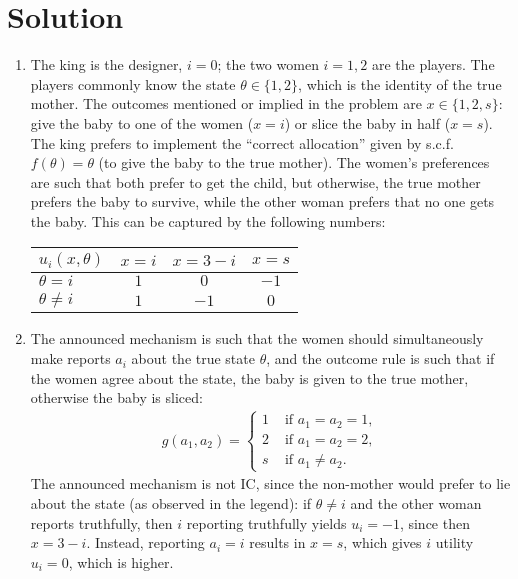 \documentclass[a4paper]{article}
\begin{document}
\section*{Solution}
\begin{enumerate}
	\item The king is the designer, $i=0$; the two women $i=1,2$ are the players. The players commonly know the state $\theta \in \{1,2\}$, which is the identity of the true mother. The outcomes mentioned or implied in the problem are $x \in \{1,2,s\}$: give the baby to one of the women ($x=i$) or slice the baby in half ($x=s$). The king prefers to implement the ``correct allocation'' given by s.c.f. $f(\theta) = \theta$ (to give the baby to the true mother). The women's preferences are such that both prefer to get the child, but otherwise, the true mother prefers the baby to survive, while the other woman prefers that no one gets the baby. This can be captured by the following numbers:
	\begin{center}
		\begin{tabular}{l | c | c | c |}
			$u_i(x,\theta)$ & $x=i$ & $x=3-i$	& $x=s$	\\ \hline
			$\theta=i$		& $1$ 	& $0$ 		& $-1$	\\ \hline
			$\theta \neq i$	& $1$	& $-1$		& $0$	\\ \hline
		\end{tabular}
	\end{center}
	
	\item The announced mechanism is such that the women should simultaneously make reports $a_i$ about the true state $\theta$, and the outcome rule is such that if the women agree about the state, the baby is given to the true mother, otherwise the baby is sliced:
	\begin{align*}
		g(a_1,a_2) = \begin{cases}
			1 & \text{ if } a_1=a_2=1, 
			\\
			2 & \text{ if } a_1=a_2=2, 
			\\
			s & \text{ if } a_1 \neq a_2. 
		\end{cases}
	\end{align*}
	The announced mechanism is not IC, since the non-mother would prefer to lie about the state (as observed in the legend): if $\theta \neq i$ and the other woman reports truthfully, then $i$ reporting truthfully yields $u_i = -1$, since then $x=3-i$. Instead, reporting $a_i = i$ results in $x=s$, which gives $i$ utility $u_i=0$, which is higher.
	

\end{enumerate}
\end{document}
